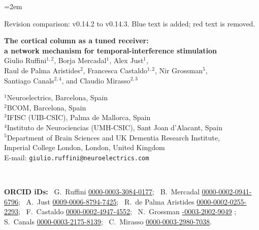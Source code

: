 \documentclass[11pt,a4paper]{article}
\newif\ifjne
\providecommand{\DIFaddtex}[1]{{\protect\color{blue} \sf #1}} %
\providecommand{\DIFaddbegin}{} %
\providecommand{\DIFaddend}{} %
\providecommand{\DIFdelbegin}{} %
\providecommand{\DIFdelend}{} %
\providecommand{\DIFadd}[1]{\texorpdfstring{\DIFaddtex{#1}}{#1}} %
\begin{document}
\emergencystretch=2em
\begin{center}\small Revision comparison: v0.14.2 to v0.14.3. Blue text is added; red text is removed.\end{center}


\ifjne
\begin{center}
{\LARGE\bfseries The cortical column as a tuned receiver:\\[4pt]
a network mechanism for temporal-interference stimulation}\\[16pt]
{\large Giulio Ruffini$^{1,2}$, Borja Mercadal$^{1}$, Alex Just$^{1}$,\DIFaddbegin \\[2pt]
\DIFaddend Raul de Palma Aristides$^{2}$, \DIFdelbegin %
\DIFdelend Francesca Castaldo$^{1,2}$, \DIFaddbegin \DIFadd{Nir Grossman$^{5}$,}\\[2pt]
\DIFaddend Santiago Canals$^{2,4}$, and Claudio Mirasso$^{2,3}$}\\[12pt]
\begin{minipage}{0.86\textwidth}\centering\small
$^{1}$Neuroelectrics, Barcelona, Spain\\
$^{2}$BCOM, Barcelona, Spain\\
$^{3}$IFISC (UIB-CSIC), Palma de Mallorca, Spain\\
$^{4}$Instituto de Neurociencias (UMH-CSIC), Sant Joan d'Alacant, Spain\DIFaddbegin \\
\DIFadd{$^{5}$Department of Brain Sciences and UK Dementia Research Institute,}\\
\DIFadd{Imperial College London, London, United Kingdom}\DIFaddend \\[6pt]
E-mail: \texttt{giulio.ruffini@neuroelectrics.com}
\end{minipage}\\[8pt]
\begin{minipage}{0.86\textwidth}\centering\footnotesize\color{negray}
\textbf{ORCID iDs:}\ %
G.~Ruffini \href{https://orcid.org/0000-0003-3084-0177}{0000-0003-3084-0177};\ %
B.~Mercadal \href{https://orcid.org/0000-0002-0941-6796}{0000-0002-0941-6796};\ %
A.~Just \href{https://orcid.org/0009-0006-8794-7425}{0009-0006-8794-7425};\ %
R.~de Palma Aristides \href{https://orcid.org/0000-0002-0255-2293}{0000-0002-0255-2293};\ %
F.~Castaldo \href{https://orcid.org/0000-0002-4947-4552}{0000-0002-4947-4552};\ %
\DIFaddbegin \DIFadd{N.~Grossman }\href{https://orcid.org/0000-0003-2002-9049}{\DIFadd{0000-0003-2002-9049}}\DIFadd{;\ %
}\DIFaddend S.~Canals \href{https://orcid.org/0000-0003-2175-8139}{0000-0003-2175-8139};\ %
C.~Mirasso \href{https://orcid.org/0000-0003-2980-7038}{0000-0003-2980-7038}.
\end{minipage}
\end{center}
\end{document}
